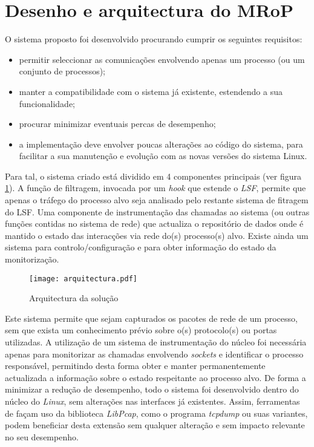 \section{Desenho e arquitectura do MRoP}
\label{sec:mrop_architecture}

O sistema proposto foi desenvolvido procurando cumprir os seguintes requisitos:
\begin{itemize}
\item permitir seleccionar as comunicações envolvendo apenas um processo (ou um conjunto de processos);
\item manter a compatibilidade com o sistema já existente, estendendo a sua funcionalidade;
\item procurar minimizar eventuais percas de desempenho;
\item a implementação deve envolver poucas alterações ao código do sistema, para facilitar a sua manutenção e evolução com as novas versões do sistema Linux.
\end{itemize}

Para tal, o sistema criado está dividido em 4 componentes principais (ver figura \ref{arquitectura}).
A função de filtragem, invocada por um \textit{hook} que estende o \textit{LSF}, permite que apenas o tráfego do processo alvo seja analisado pelo restante sistema de fitragem do LSF.
Uma componente de instrumentação das chamadas ao sistema (ou outras funções contidas no sistema de rede) que actualiza o repositório de dados onde é mantido o estado das interacções via rede do(s) processo(s) alvo.
Existe ainda um sistema para controlo/configuração e para obter informação do estado da monitorização.

\begin{figure}[htbp]
\begin{center}
\texttt{[image: arquitectura.pdf]} 
\caption{Arquitectura da solução}
\label{arquitectura}
\end{center}
\end{figure}

Este sistema permite que sejam capturados os pacotes de rede de um processo, sem que exista um conhecimento prévio sobre o(s) protocolo(s) ou portas utilizadas.
 A utilização de um sistema de instrumentação do núcleo foi necessária apenas para monitorizar as chamadas envolvendo \emph{sockets} e identificar o processo responsável, permitindo desta forma obter e manter permanentemente actualizada a informação sobre o estado respeitante ao processo alvo.
 De forma a minimizar a redução de desempenho, todo o sistema foi desenvolvido dentro do núcleo do \textit{Linux}, sem alterações nas interfaces já existentes.
 Assim, ferramentas de façam uso da biblioteca \textit{LibPcap}, como o programa \textit{tcpdump} ou suas variantes, podem beneficiar desta extensão sem qualquer alteração e sem impacto relevante no seu desempenho.

